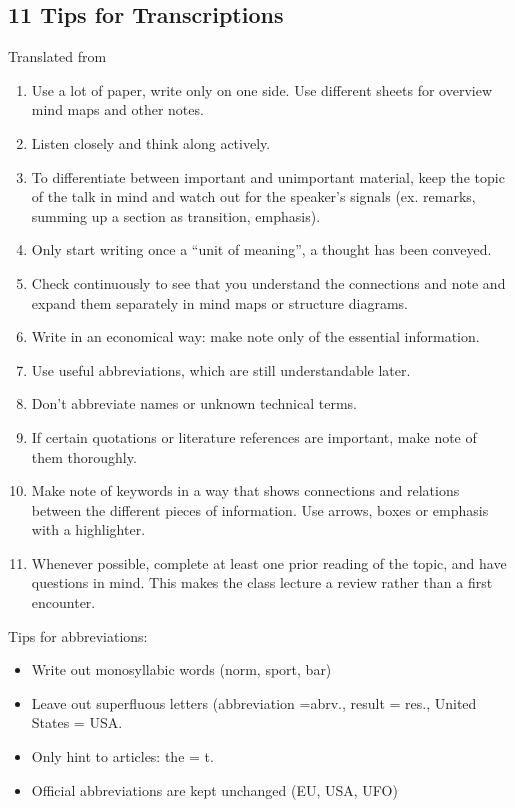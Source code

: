 \documentclass[../main.tex]{subfiles}
\begin{document}
\subsection{11 Tips for Transcriptions}
Translated from~\cite{Teachsam}

\begin{enumerate}
\item Use a {lot of paper}, write only on one side. Use different sheets for overview mind maps and other notes.
\item {Listen closely} and {think along actively}.
\item To differentiate between important and unimportant material, keep the topic of the talk in mind and watch out for the {speaker's signals} (ex. remarks, summing up a section as transition, emphasis). 
\item Only start writing once a ``unit of meaning'', a thought has been conveyed. 
\item Check continuously to see that you {understand the connections} and note and expand them separately in {mind maps or structure diagrams}.
\item Write in an {economical} way: make  note only of the {essential} information.
\item Use {useful abbreviations}, which are still understandable later.
\item {Don't abbreviate names} or unknown technical terms.
\item If certain {quotations or literature references} are important, make note of  them {thoroughly}.  
\item Make note of keywords in a way that shows {connections and relations} between the different pieces of information. Use {arrows, boxes or emphasis} with a highlighter. 
\item Whenever possible, complete at least one {prior reading of the topic}, and have {questions} in mind. This makes the class lecture a review rather than a first encounter.
\end{enumerate}

\newpage
Tips for abbreviations:

\begin{itemize}
\item Write out monosyllabic words (norm, sport, bar)
\item Leave out superfluous letters (abbreviation =abrv., result = res., United States = USA.
\item Only hint to articles: the = t. 
\item Official abbreviations are kept unchanged (EU, USA, UFO)
\end{itemize}
\end{document}
